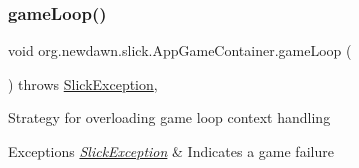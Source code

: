 \subsubsection{\texorpdfstring{game\+Loop()}{gameLoop()}}
{\footnotesize\ttfamily void org.\+newdawn.\+slick.\+App\+Game\+Container.\+game\+Loop (\begin{DoxyParamCaption}{ }\end{DoxyParamCaption}) throws \mbox{\hyperlink{classorg_1_1newdawn_1_1slick_1_1_slick_exception}{Slick\+Exception}}\hspace{0.3cm}{\ttfamily [inline]}, {\ttfamily [protected]}}

Strategy for overloading game loop context handling


\begin{DoxyExceptions}{Exceptions}
{\em \mbox{\hyperlink{classorg_1_1newdawn_1_1slick_1_1_slick_exception}{Slick\+Exception}}} & Indicates a game failure \\
\hline
\end{DoxyExceptions}

